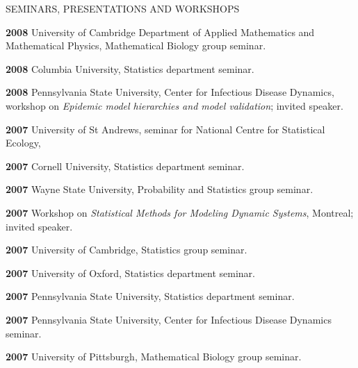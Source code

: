 \begin{mylist}{SEMINARS, PRESENTATIONS AND WORKSHOPS}
\item{\bf 2008 } University of Cambridge Department of Applied Mathematics and Mathematical Physics, Mathematical Biology group seminar.

\item{\bf 2008 } Columbia University, Statistics department seminar.

\item{\bf 2008 } Pennsylvania State University, Center for Infectious Disease Dynamics, workshop on {\it Epidemic model hierarchies and model validation}; invited speaker.

\item{\bf 2007 } University of St Andrews, seminar for National Centre for Statistical Ecology, 

\item{\bf 2007 } Cornell University, Statistics department seminar.

\item{\bf 2007 } Wayne State University, Probability and Statistics group seminar.
 	
\item{\bf 2007 }  Workshop on {\it Statistical Methods for Modeling Dynamic Systems}, Montreal; invited speaker.

\item{\bf 2007 } University of Cambridge, Statistics group seminar.

\item{\bf 2007 } University of Oxford, Statistics department seminar.


\item{\bf 2007 } Pennsylvania State University, Statistics department seminar.

\item{\bf 2007 } Pennsylvania State University, Center for Infectious Disease Dynamics seminar.

\item{\bf 2007 } University of Pittsburgh, Mathematical Biology group seminar.


\end{mylist}
